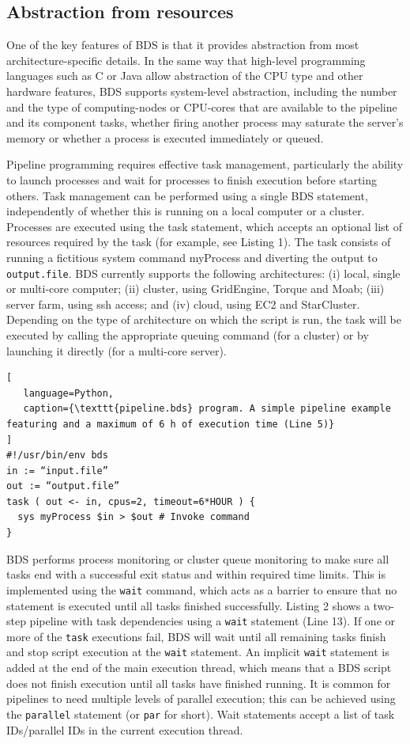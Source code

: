 \subsection{Abstraction from resources}

One of the key features of BDS is that it provides abstraction from most architecture-specific details. In the same way that high-level programming languages such as C or Java allow abstraction of the CPU type and other hardware features, BDS supports system-level abstraction, including the number and the type of computing-nodes or CPU-cores that are available to the pipeline and its component tasks, whether firing another process may saturate the server’s memory or whether a process is executed immediately or queued.

Pipeline programming requires effective task management, particularly the ability to launch processes and wait for processes to finish execution before starting others. Task management can be performed using a single BDS statement, independently of whether this is running on a local computer or a cluster. Processes are executed using the task statement, which accepts an optional list of resources required by the task (for example, see Listing 1). The task consists of running a fictitious system command myProcess and diverting the output to \texttt{output.file}. BDS currently supports the following architectures: (i) local, single or multi-core computer; (ii) cluster, using GridEngine, Torque and Moab; (iii) server farm, using ssh access; and (iv) cloud, using EC2 and StarCluster. Depending on the type of architecture on which the script is run, the task will be executed by calling the appropriate queuing command (for a cluster) or by launching it directly (for a multi-core server).

\begin{lstlisting}[
   language=Python,
   caption={\texttt{pipeline.bds} program. A simple pipeline example featuring and a maximum of 6 h of execution time (Line 5)}
]
#!/usr/bin/env bds
in := “input.file”
out := “output.file”
task ( out <- in, cpus=2, timeout=6*HOUR ) {
  sys myProcess $in > $out # Invoke command
}
\end{lstlisting}

BDS performs process monitoring or cluster queue monitoring to make sure all tasks end with a successful exit status and within required time limits. This is implemented using the \texttt{wait} command, which acts as a barrier to ensure that no statement is executed until all tasks finished successfully. Listing 2 shows a two-step pipeline with task dependencies using a \texttt{wait} statement (Line 13). If one or more of the \texttt{task} executions fail, BDS will wait until all remaining tasks finish and stop script execution at the \texttt{wait} statement. An implicit \texttt{wait} statement is added at the end of the main execution thread, which means that a BDS script does not finish execution until all tasks have finished running. It is common for pipelines to need multiple levels of parallel execution; this can be achieved using the \texttt{parallel} statement (or \texttt{par} for short). Wait statements accept a list of task IDs/parallel IDs in the current execution thread.

